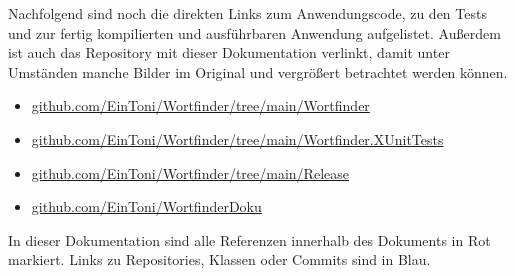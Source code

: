 Nachfolgend sind noch die direkten Links zum Anwendungscode, zu den Tests und zur fertig kompilierten und ausführbaren Anwendung aufgelistet. Außerdem ist auch das Repository mit dieser Dokumentation verlinkt, damit unter Umständen manche Bilder im Original und vergrößert betrachtet werden können.

\begin{itemize}
\item{\href{https://github.com/EinToni/Wortfinder/tree/main/Wortfinder}{github.com/EinToni/Wortfinder/tree/main/Wortfinder}}
\item{\href{https://github.com/EinToni/Wortfinder/tree/main/Wortfinder.XUnitTests}{github.com/EinToni/Wortfinder/tree/main/Wortfinder.XUnitTests}}
\item{\href{https://github.com/EinToni/Wortfinder/tree/main/Release}{github.com/EinToni/Wortfinder/tree/main/Release}}
\item{\href{https://github.com/EinToni/WortfinderDoku}{github.com/EinToni/WortfinderDoku}}
\end{itemize}

In dieser Dokumentation sind alle Referenzen innerhalb des Dokuments in Rot markiert. Links zu Repositories, Klassen oder Commits sind in Blau.